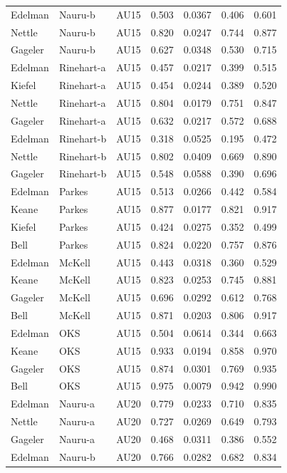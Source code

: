 \documentclass{monashthesis}
\begin{document}
\begin{center}
\begin{longtable}{lllllll}
Edelman & Nauru-b & AU15 & 0.503 & 0.0367 & 0.406 & 0.601 \\
Nettle & Nauru-b & AU15 & 0.820 & 0.0247 & 0.744 & 0.877 \\
Gageler & Nauru-b & AU15 & 0.627 & 0.0348 & 0.530 & 0.715 \\
Edelman & Rinehart-a & AU15 & 0.457 & 0.0217 & 0.399 & 0.515 \\
Kiefel & Rinehart-a & AU15 & 0.454 & 0.0244 & 0.389 & 0.520 \\
Nettle & Rinehart-a & AU15 & 0.804 & 0.0179 & 0.751 & 0.847 \\
Gageler & Rinehart-a & AU15 & 0.632 & 0.0217 & 0.572 & 0.688 \\
Edelman & Rinehart-b & AU15 & 0.318 & 0.0525 & 0.195 & 0.472 \\
Nettle & Rinehart-b & AU15 & 0.802 & 0.0409 & 0.669 & 0.890 \\
Gageler & Rinehart-b & AU15 & 0.548 & 0.0588 & 0.390 & 0.696 \\
Edelman & Parkes & AU15 & 0.513 & 0.0266 & 0.442 & 0.584 \\
Keane & Parkes & AU15 & 0.877 & 0.0177 & 0.821 & 0.917 \\
Kiefel & Parkes & AU15 & 0.424 & 0.0275 & 0.352 & 0.499 \\
Bell & Parkes & AU15 & 0.824 & 0.0220 & 0.757 & 0.876 \\
Edelman & McKell & AU15 & 0.443 & 0.0318 & 0.360 & 0.529 \\
Keane & McKell & AU15 & 0.823 & 0.0253 & 0.745 & 0.881 \\
Gageler & McKell & AU15 & 0.696 & 0.0292 & 0.612 & 0.768 \\
Bell & McKell & AU15 & 0.871 & 0.0203 & 0.806 & 0.917 \\
Edelman & OKS & AU15 & 0.504 & 0.0614 & 0.344 & 0.663 \\
Keane & OKS & AU15 & 0.933 & 0.0194 & 0.858 & 0.970 \\
Gageler & OKS & AU15 & 0.874 & 0.0301 & 0.769 & 0.935 \\
Bell & OKS & AU15 & 0.975 & 0.0079 & 0.942 & 0.990 \\
Edelman & Nauru-a & AU20 & 0.779 & 0.0233 & 0.710 & 0.835 \\
Nettle & Nauru-a & AU20 & 0.727 & 0.0269 & 0.649 & 0.793 \\
Gageler & Nauru-a & AU20 & 0.468 & 0.0311 & 0.386 & 0.552 \\
Edelman & Nauru-b & AU20 & 0.766 & 0.0282 & 0.682 & 0.834 \\

\end{longtable}
\end{center}
\end{document}
